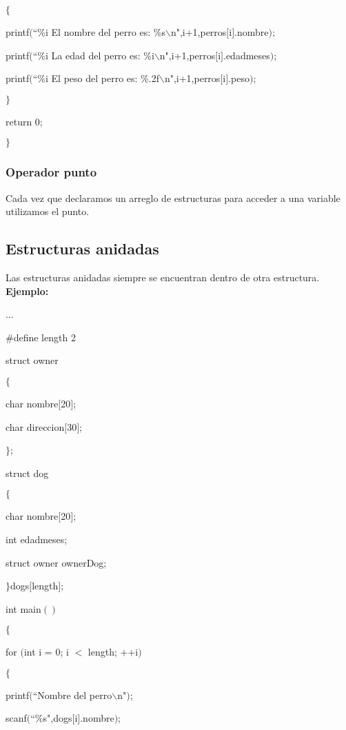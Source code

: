 \documentclass[]{article}
\begin{document}
	$\lbrace$
	
	printf$($``\%i El nombre del perro es: \%s$\backslash$n",i+1,perros$[$i$]$.nombre$)$;
	
	printf$($``\%i La edad del perro es: \%i$\backslash$n",i+1,perros$[$i$]$.edadmeses$)$;
	
	printf$($``\%i El peso del perro es: \%.2f$\backslash$n",i+1,perros$[$i$]$.peso$)$;
	
	$\rbrace$
	
	return 0;
	
	$\rbrace$
	
	\subsubsection{Operador punto}
	
	Cada vez que declaramos un arreglo de estructuras para acceder a una variable utilizamos el punto.
	
	\subsection{Estructuras anidadas}
	Las estructuras anidadas siempre se encuentran dentro de otra estructura.\\
	
	\textbf{Ejemplo:\\}
	
	...
	
	\#define length 2
	
	struct owner
	
	$\lbrace$
	
	char nombre$[$20$]$;
	
	char direccion$[$30$]$;
	
	$\rbrace$;
	
	struct dog
	
	$\lbrace$
	
	char nombre$[$20$]$;
	
	int edadmeses;
	
	struct owner ownerDog;
	
	$\rbrace$dogs$[$length$]$;
	
	int main$()$
	
	$\lbrace$
	
	for $($int i = 0; i $<$ length; ++i$)$
	
	$\lbrace$
	
	printf$($``Nombre del perro$\backslash$n"$)$;
	
	scanf$($``\%s",dogs$[$i$]$.nombre$)$;
	
\end{document}
